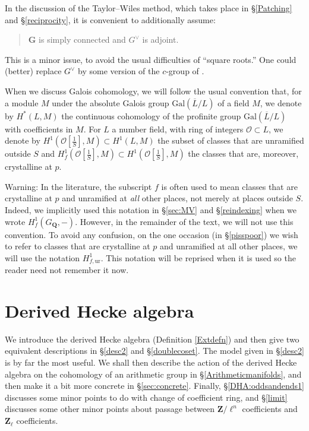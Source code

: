 \documentclass[10pt]{amsart}
\newcommand{\changecolor}{black}
\newcommand{\Z}{\mathbf{Z}}
\newcommand{\Q}{\mathbf{Q}}
\theoremstyle{remark}
\begin{document}
       In the discussion of the Taylor--Wiles method, which takes place in \S \ref{Patching} and \S \ref{reciprocity},
     it is convenient to additionally assume:
     \begin{quote} $\mathbf{G}$ is simply connected and $G^{\vee}$ is adjoint.
     \end{quote}
     This is a minor issue, to avoid the usual difficulties of ``square roots.'' One could (better) replace $G^{\vee}$ by some version of the $c$-group of \cite{BG}.
         
      
      When we discuss Galois cohomology, we will follow the usual convention
that, for a module $M$ under the absolute Galois group $\mathrm{Gal}(\overline{L}/L)$ of a field $M$,
we denote by $H^*(L,M)$ the  continuous cohomology of the profinite group    $\mathrm{Gal}(\overline{L}/L)$  with coefficients in $M$. 
  For $L$ a number field, with ring of integers $\mathcal{O} \subset L$, we denote by $H^1(\mathcal{O}[\frac{1}{S}], M) \subset H^1(L, M)$ the subset of classes
  that are unramified outside $S$ and $H^1_f(\mathcal{O}[\frac{1}{S}], M) \subset H^1(\mathcal{O}[\frac{1}{S}], M)$ the  classes that are, moreover, crystalline at $p$. 
  
  
{\color{\changecolor} Warning: In the literature, the subscript $f$  is often used to mean classes that are crystalline at $p$ and unramified at {\em all} other places,
 not merely at places outside $S$.   Indeed, we implicitly used this notation in \S \ref{sec:MV} and \S \ref{reindexing} when we wrote $H^1_f(G_{\Q}, -)$. 
 However, in the remainder of the text, we will not use this convention. To avoid any confusion, on the one occasion (in \S \ref{pisspoor})
 we wish to refer to classes that are crystalline at $p$ and unramified at all other places, we will use the notation $H^1_{f, \mathrm{ur}}$. This notation will be reprised when it is used so the reader need not remember it now.}
    
  \section{Derived Hecke algebra} \label{sec:dha}
     
We introduce the derived Hecke algebra (Definition \ref{Extdefn}) and then give
two equivalent descriptions in \S \ref{desc2} and  \S \ref{doublecoset}.   The model given in \S \ref{desc2} is by far the most useful. 
We shall then  describe the action of the derived Hecke algebra on the cohomology of an arithmetic group in 
       \S \ref{Arithmeticmanifolds}, and then make it a bit more concrete in \S \ref{sec:concrete}. 
       Finally, \S \ref{DHA:oddsandends1} discusses some minor points to do with change of coefficient ring,
       and \S \ref{limit} discusses some other minor points about passage between $\Z/\ell^n$ coefficients and $\Z_{\ell}$ coefficients. 
       
\end{document}
